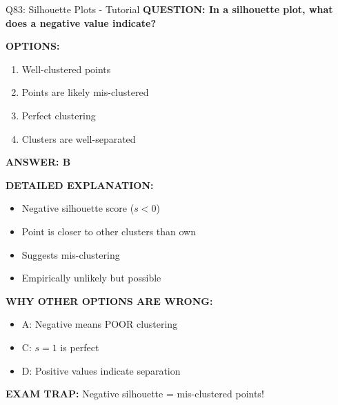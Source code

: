 \documentclass[8pt]{beamer}
\begin{document}
	\begin{frame}{Q83: Silhouette Plots - Tutorial}
		\fontsize{6.5}{7.5}\selectfont
		\textbf{QUESTION: In a silhouette plot, what does a negative value indicate?}
		
		\vspace{0.1cm}
		\textbf{OPTIONS:}
		\begin{enumerate}
			\item Well-clustered points
			\item Points are likely mis-clustered
			\item Perfect clustering
			\item Clusters are well-separated
		\end{enumerate}
		
		\vspace{0.1cm}
		\textcolor{myblue}{\textbf{ANSWER: B}}
		
		\vspace{0.1cm}
		\textbf{DETAILED EXPLANATION:}
		\begin{itemize}
			\item Negative silhouette score ($s < 0$)
			\item Point is closer to other clusters than own
			\item Suggests mis-clustering
			\item Empirically unlikely but possible
		\end{itemize}
		
		\vspace{0.1cm}
		\textcolor{myred}{\textbf{WHY OTHER OPTIONS ARE WRONG:}}
		\begin{itemize}
			\item \textcolor{myred}{A:} Negative means POOR clustering
			\item \textcolor{myred}{C:} $s = 1$ is perfect
			\item \textcolor{myred}{D:} Positive values indicate separation
		\end{itemize}
		
		\textcolor{myred}{\textbf{EXAM TRAP:}} Negative silhouette = \textcolor{myblue}{mis-clustered points}!
	\end{frame}
	
\end{document}

